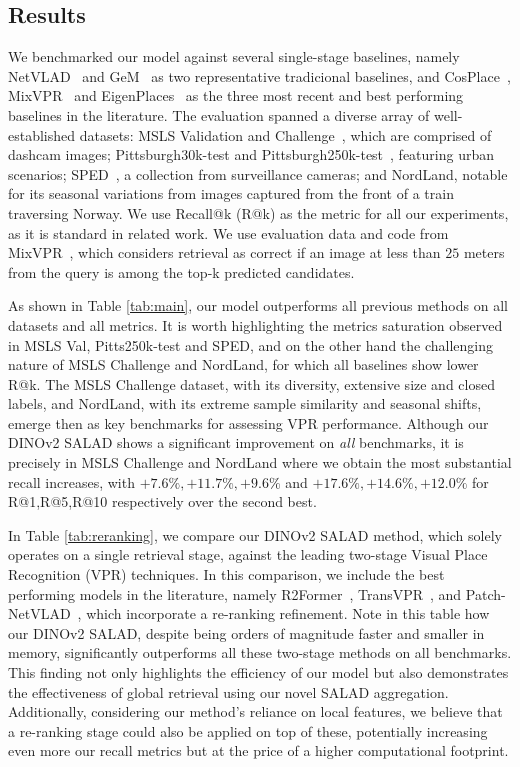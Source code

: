 \documentclass[10pt,twocolumn,letterpaper]{article}
\begin{document}
\subsection{Results}
\label{subsec:results}

We benchmarked our model against several single-stage baselines, namely NetVLAD~\cite{arandjelovic2016netvlad} and GeM~\cite{radenovic2018fine} as two representative tradicional baselines, and CosPlace~\cite{berton2022rethinking}, MixVPR~\cite{ali2023mixvpr} and EigenPlaces~\cite{berton2023eigenplaces} as the three most recent and best performing baselines in the literature. The evaluation spanned a diverse array of well-established datasets: MSLS Validation and Challenge~\cite{warburg2020mapillary}, which are comprised of dashcam images; Pittsburgh30k-test and Pittsburgh250k-test~\cite{torii2013visual}, featuring urban scenarios; SPED~\cite{chen2018learning}, a collection from surveillance cameras; and NordLand, notable for its seasonal variations from images captured from the front of a train traversing Norway. We use Recall@k (R@k) as the metric for all our experiments, as it is standard in related work. We use evaluation data and code from MixVPR~\cite{ali2023mixvpr}, which considers retrieval as correct if an image at less than $25$ meters from the query is among the top-k predicted candidates.

As shown in Table \ref{tab:main}, our model outperforms all previous methods on all datasets and all metrics. It is worth highlighting the metrics saturation observed in MSLS Val, Pitts250k-test and SPED, and on the other hand the challenging nature of MSLS Challenge and NordLand, for which all baselines show lower R@k. The MSLS Challenge dataset, with its diversity, extensive size and closed labels, and NordLand, with its extreme sample similarity and seasonal shifts, emerge then as key benchmarks for assessing VPR performance. Although our DINOv2 SALAD shows a significant improvement on \textit{all} benchmarks, it is precisely in MSLS Challenge and NordLand where we obtain the most substantial recall increases, with $+7.6\%,+11.7\%,+9.6\%$ and $+17.6\%,+14.6\%,+12.0\%$ for R@1,R@5,R@10 respectively over the second best.

In Table \ref{tab:reranking}, we compare our DINOv2 SALAD method, which solely operates on a single retrieval stage, against the leading two-stage Visual Place Recognition (VPR) techniques. In this comparison, we include the best performing models in the literature, namely R2Former~\cite{zhu2023r2former}, TransVPR~\cite{wang2022transvpr}, and Patch-NetVLAD~\cite{hausler2021patch}, which incorporate a re-ranking refinement. 
Note in this table how our DINOv2 SALAD, despite being orders of magnitude faster and smaller in memory, significantly outperforms all these two-stage methods on all benchmarks. This finding not only highlights the efficiency of our model but also demonstrates the effectiveness of global retrieval using our novel SALAD aggregation. Additionally, considering our method's reliance on local features, we believe that a re-ranking stage could also be applied on top of these, potentially increasing even more our recall metrics but at the price of a higher computational footprint.
\end{document}
